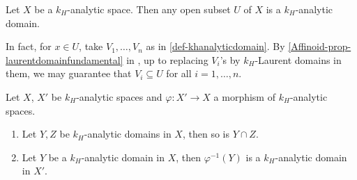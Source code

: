 \begin{example}\label{ex-opensubspace}
    Let $X$ be a $k_H$-analytic space. Then any open subset $U$ of $X$ is a $k_H$-analytic domain. 

    In fact, for $x\in U$, take $V_1,\ldots,V_n$ as in \cref{def-khanalyticdomain}. By \cref{Affinoid-prop-laurentdomainfundamental} in , up to replacing $V_i$'s by $k_H$-Laurent domains in them, we may guarantee that $V_i\subseteq U$ for all $i=1,\ldots,n$.
\end{example}


\begin{proposition}\label{prop-analyticdomainprop}
    Let $X$, $X'$ be $k_H$-analytic spaces and $\varphi:X'\rightarrow X$ a morphism of $k_H$-analytic spaces. 
    \begin{enumerate}
        \item Let $Y,Z$ be $k_H$-analytic domains in $X$, then so is $Y\cap Z$.
        \item Let $Y$ be a $k_H$-analytic domain in $X$, then $\varphi^{-1}(Y)$ is a $k_H$-analytic domain in $X'$. 
    \end{enumerate}
\end{proposition}
